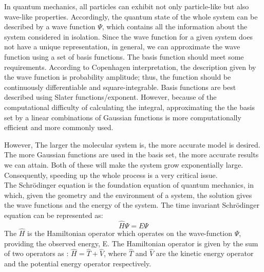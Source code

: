 \documentclass[twoside]{article}
\begin{document}
In quantum mechanics, all particles can exhibit not only particle-like but also wave-like properties. Accordingly, the quantum state of the whole system can be described by a wave function $\Psi$, which contains all the information about the system considered in isolation. Since the wave function for a given system does not have a unique representation, in general, we can approximate the wave function using a set of basis functions. The basis function should meet some requirements. According to Copenhagen interpretation, the description given by the wave function is probability amplitude; thus, the function should be continuously differentiable and square-integrable. Basis functions are best described using Slater functions/exponent. However, because of the computational difficulty of calculating the integral, approximating the the basis set by a linear combinations of Gaussian functions is more computationally efficient and more commonly used. 

However, The larger the molecular system is, the more accurate model is desired. The more Gaussian functions are used in the basis set, the more accurate results we can attain. Both of these will make the system grow exponentially large. Consequently, speeding up the whole process is a very critical issue. \\






The Schrödinger equation is the foundation equation of quantum mechanics, in which, given the geometry and the environment of a system, the solution gives the wave functions and the energy of the system. 
The time invariant Schrödinger equation can be represented as:
\[
				\hat{H}\Psi = E\Psi
\]
The $\hat{H}$ is the Hamiltonian operator which operates on the wave-function $\Psi$, providing the observed energy, E. The Hamiltonian operator is given by the sum of two operators as : $\hat{H} = \hat{T} + \hat{V}$,  where $\hat{T}$ and $\hat{V}$ are the kinetic energy operator and the potential energy operator respectively.
\end{document}
